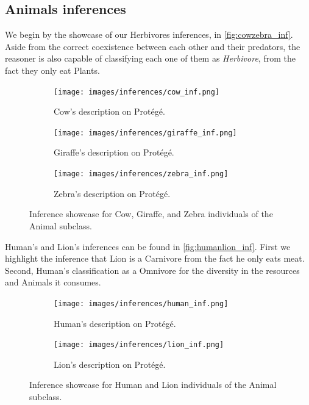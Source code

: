 \newpage

\subsection{Animals inferences}

We begin by the showcase of our Herbivores inferences, in \autoref{fig:cowzebra_inf}. Aside from the correct coexistence between each other and their predators, the reasoner is also capable of classifying each one of them as \textit{Herbivore}, from the fact they only eat Plants.

\begin{figure}[h!]
    \centering
    \begin{subfigure}[b]{0.8\linewidth}
      \texttt{[image: images/inferences/cow\_inf.png]}
      \caption{Cow's description on Protégé.}
    \end{subfigure}
    \begin{subfigure}[b]{0.8\linewidth}
      \texttt{[image: images/inferences/giraffe\_inf.png]}
      \caption{Giraffe's description on Protégé.}
    \end{subfigure}
    \begin{subfigure}[b]{0.8\linewidth}
        \texttt{[image: images/inferences/zebra\_inf.png]}
        \caption{Zebra's description on Protégé.}
      \end{subfigure}
    \caption{Inference showcase for Cow, Giraffe, and Zebra individuals of the Animal subclass.}
    \label{fig:cowzebra_inf}
\end{figure}

\newpage

Human's and Lion's inferences can be found in \autoref{fig:humanlion_inf}. First we highlight the inference that Lion is a Carnivore from the fact he only eats meat. Second, Human's classification as a Omnivore for the diversity in the resources and Animals it consumes.

\begin{figure}[h!]
    \centering
    \begin{subfigure}[b]{0.8\linewidth}
      \texttt{[image: images/inferences/human\_inf.png]}
      \caption{Human's description on Protégé.}
    \end{subfigure}
    \begin{subfigure}[b]{0.8\linewidth}
      \texttt{[image: images/inferences/lion\_inf.png]}
      \caption{Lion's description on Protégé.}
    \end{subfigure}
    
    \caption{Inference showcase for Human and Lion individuals of the Animal subclass.}
    \label{fig:humanlion_inf}
\end{figure}



